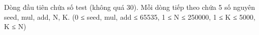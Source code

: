 Dòng đầu tiên chứa số test (không quá 30). Mỗi dòng tiếp theo chứa 5 số nguyên seed, mul, add, N, K. (0 ≤ seed, mul, add ≤ 65535, 1 ≤ N ≤ 250000, 1 ≤ K ≤ 5000, K ≤ N)